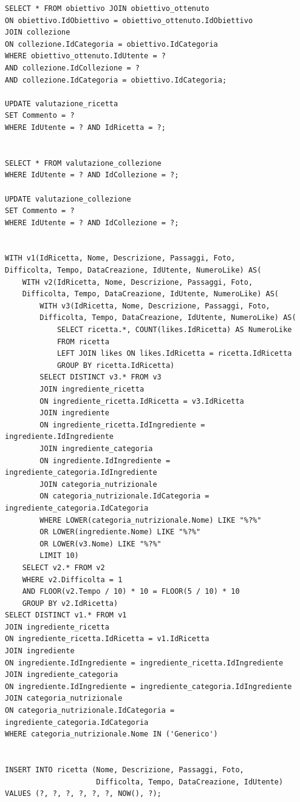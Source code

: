 ﻿\documentclass[a4paper,12pt]{report}
\begin{document}
\begin{verbatim}
SELECT * FROM obiettivo JOIN obiettivo_ottenuto
ON obiettivo.IdObiettivo = obiettivo_ottenuto.IdObiettivo
JOIN collezione
ON collezione.IdCategoria = obiettivo.IdCategoria
WHERE obiettivo_ottenuto.IdUtente = ?
AND collezione.IdCollezione = ?
AND collezione.IdCategoria = obiettivo.IdCategoria;

UPDATE valutazione_ricetta
SET Commento = ?
WHERE IdUtente = ? AND IdRicetta = ?;


SELECT * FROM valutazione_collezione
WHERE IdUtente = ? AND IdCollezione = ?;

UPDATE valutazione_collezione
SET Commento = ?
WHERE IdUtente = ? AND IdCollezione = ?;


WITH v1(IdRicetta, Nome, Descrizione, Passaggi, Foto,
Difficolta, Tempo, DataCreazione, IdUtente, NumeroLike) AS(
    WITH v2(IdRicetta, Nome, Descrizione, Passaggi, Foto, 
    Difficolta, Tempo, DataCreazione, IdUtente, NumeroLike) AS(
        WITH v3(IdRicetta, Nome, Descrizione, Passaggi, Foto, 
        Difficolta, Tempo, DataCreazione, IdUtente, NumeroLike) AS(
            SELECT ricetta.*, COUNT(likes.IdRicetta) AS NumeroLike
            FROM ricetta
            LEFT JOIN likes ON likes.IdRicetta = ricetta.IdRicetta
            GROUP BY ricetta.IdRicetta)
        SELECT DISTINCT v3.* FROM v3
        JOIN ingrediente_ricetta
        ON ingrediente_ricetta.IdRicetta = v3.IdRicetta
        JOIN ingrediente
        ON ingrediente_ricetta.IdIngrediente = ingrediente.IdIngrediente
        JOIN ingrediente_categoria
        ON ingrediente.IdIngrediente = ingrediente_categoria.IdIngrediente
        JOIN categoria_nutrizionale 
        ON categoria_nutrizionale.IdCategoria = ingrediente_categoria.IdCategoria
        WHERE LOWER(categoria_nutrizionale.Nome) LIKE "%?%"
        OR LOWER(ingrediente.Nome) LIKE "%?%"
        OR LOWER(v3.Nome) LIKE "%?%"
        LIMIT 10)
    SELECT v2.* FROM v2
    WHERE v2.Difficolta = 1
    AND FLOOR(v2.Tempo / 10) * 10 = FLOOR(5 / 10) * 10 
    GROUP BY v2.IdRicetta)
SELECT DISTINCT v1.* FROM v1
JOIN ingrediente_ricetta
ON ingrediente_ricetta.IdRicetta = v1.IdRicetta
JOIN ingrediente
ON ingrediente.IdIngrediente = ingrediente_ricetta.IdIngrediente
JOIN ingrediente_categoria
ON ingrediente.IdIngrediente = ingrediente_categoria.IdIngrediente
JOIN categoria_nutrizionale
ON categoria_nutrizionale.IdCategoria = ingrediente_categoria.IdCategoria
WHERE categoria_nutrizionale.Nome IN ('Generico')


INSERT INTO ricetta (Nome, Descrizione, Passaggi, Foto,
                     Difficolta, Tempo, DataCreazione, IdUtente)
VALUES (?, ?, ?, ?, ?, ?, NOW(), ?);


\end{verbatim}
\end{document}
